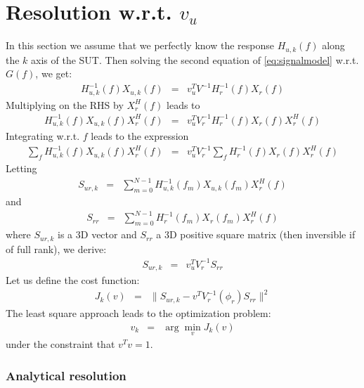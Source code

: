 \documentclass[a4paper, 12pt]{report}
\begin{document}
\section{Resolution w.r.t. $v_{u}$}
In this section we assume that we perfectly know the response $H_{u,k}(f)$ along the $k$ axis of the SUT. Then solving the second equation of \eqref{eq:signalmodel} w.r.t. $G(f)$, we get:
\begin{eqnarray}
\label{eq:XuasXr}
H_{u,k}^{-1}(f)X_{u,k}(f)&=&v_{u}^{T}V ^{-1}H_{r}^{-1}(f)X_{r}(f)
\end{eqnarray}
Multiplying on the RHS by $X_{r}^{H}(f)$ leads to
\begin{eqnarray*}
H_{u,k}^{-1}(f)X_{u,k}(f)X_{r}^{H}(f)&=&v_{u}^{T}V _{r}^{-1}H_{r}^{-1}(f)X_{r}(f)X_{r}^{H}(f)
\end{eqnarray*}
Integrating w.r.t. $f$ leads to the expression
\begin{eqnarray}
\label{eq:integrateonf}
\sum_{f} H_{u,k}^{-1}(f)X_{u,k}(f)X_{r}^{H}(f)&=&
v_{u}^{T}V_{r}^{-1}
\sum_{f} H_{r}^{-1}(f)X_{r}(f)X_{r}^{H}(f)
\end{eqnarray}
Letting
\begin{eqnarray*}
S_{ur,k}&=&\sum_{m=0}^{N-1} H_{u,k}^{-1}(f_{m})X_{u,k}(f_{m})X_{r}^{H}(f)
\end{eqnarray*}
and 
\begin{eqnarray*}
S_{rr}&=&\sum_{m=0}^{N-1} H_{r}^{-1}(f_{m})X_{r}(f_{m})X_{r}^{H}(f)
\end{eqnarray*}
where $S_{ur,k}$ is a 3D vector and $S_{rr}$ a $3$D positive square matrix (then inversible if of full rank), 
we derive:
\begin{eqnarray}
\label{eq:linearmodel}
S_{ur,k}&=&v_{u}^{T}V_{r}^{-1}S_{rr}
\end{eqnarray}
Let us define the cost function:
\begin{eqnarray}
\label{eq:pbtosolve}
J_{k}(v) &=&  \|S_{ur,k} - v^{T}V_{r}^{-1}(\phi_{r})S_{rr}\|^{2}
\end{eqnarray}
The least square approach leads to the optimization problem:
\begin{eqnarray}
 \label{eq:hatphi}
v_{k} &=& \arg\min_{v} J_{k}(v)
\end{eqnarray}
under the constraint that $v^{T}v=1$.

 
 
 \subsubsection{Analytical resolution}
 
\end{document}
